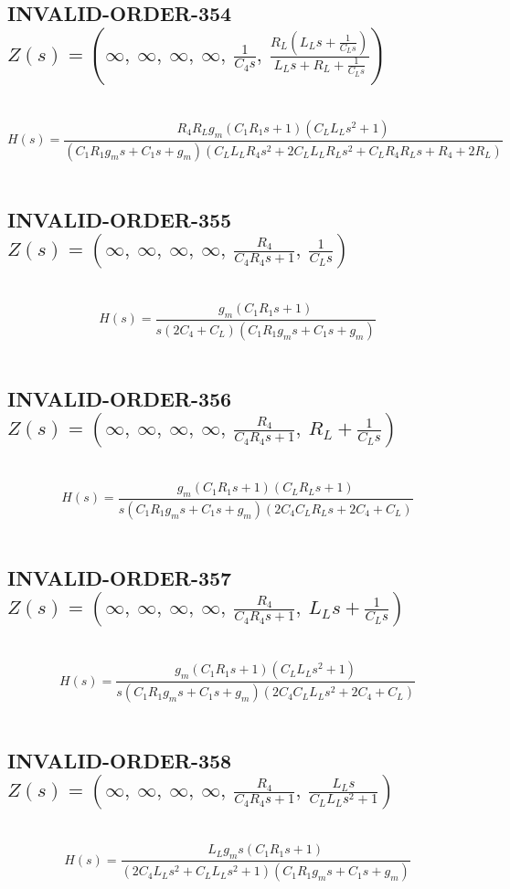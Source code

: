 \documentclass{article}
\begin{document}
\subsection{INVALID-ORDER-354 $Z(s) = \left( \infty, \  \infty, \  \infty, \  \infty, \  \frac{1}{C_{4} s}, \  \frac{R_{L} \left(L_{L} s + \frac{1}{C_{L} s}\right)}{L_{L} s + R_{L} + \frac{1}{C_{L} s}}\right)$ } \ 
\textbf{\[H(s) = \frac{R_{4} R_{L} g_{m} \left(C_{1} R_{1} s + 1\right) \left(C_{L} L_{L} s^{2} + 1\right)}{\left(C_{1} R_{1} g_{m} s + C_{1} s + g_{m}\right) \left(C_{L} L_{L} R_{4} s^{2} + 2 C_{L} L_{L} R_{L} s^{2} + C_{L} R_{4} R_{L} s + R_{4} + 2 R_{L}\right)}\] } \ 
\subsection{INVALID-ORDER-355 $Z(s) = \left( \infty, \  \infty, \  \infty, \  \infty, \  \frac{R_{4}}{C_{4} R_{4} s + 1}, \  \frac{1}{C_{L} s}\right)$ } \ 
\textbf{\[H(s) = \frac{g_{m} \left(C_{1} R_{1} s + 1\right)}{s \left(2 C_{4} + C_{L}\right) \left(C_{1} R_{1} g_{m} s + C_{1} s + g_{m}\right)}\] } \ 
\subsection{INVALID-ORDER-356 $Z(s) = \left( \infty, \  \infty, \  \infty, \  \infty, \  \frac{R_{4}}{C_{4} R_{4} s + 1}, \  R_{L} + \frac{1}{C_{L} s}\right)$ } \ 
\textbf{\[H(s) = \frac{g_{m} \left(C_{1} R_{1} s + 1\right) \left(C_{L} R_{L} s + 1\right)}{s \left(C_{1} R_{1} g_{m} s + C_{1} s + g_{m}\right) \left(2 C_{4} C_{L} R_{L} s + 2 C_{4} + C_{L}\right)}\] } \ 
\subsection{INVALID-ORDER-357 $Z(s) = \left( \infty, \  \infty, \  \infty, \  \infty, \  \frac{R_{4}}{C_{4} R_{4} s + 1}, \  L_{L} s + \frac{1}{C_{L} s}\right)$ } \ 
\textbf{\[H(s) = \frac{g_{m} \left(C_{1} R_{1} s + 1\right) \left(C_{L} L_{L} s^{2} + 1\right)}{s \left(C_{1} R_{1} g_{m} s + C_{1} s + g_{m}\right) \left(2 C_{4} C_{L} L_{L} s^{2} + 2 C_{4} + C_{L}\right)}\] } \ 
\subsection{INVALID-ORDER-358 $Z(s) = \left( \infty, \  \infty, \  \infty, \  \infty, \  \frac{R_{4}}{C_{4} R_{4} s + 1}, \  \frac{L_{L} s}{C_{L} L_{L} s^{2} + 1}\right)$ } \ 
\textbf{\[H(s) = \frac{L_{L} g_{m} s \left(C_{1} R_{1} s + 1\right)}{\left(2 C_{4} L_{L} s^{2} + C_{L} L_{L} s^{2} + 1\right) \left(C_{1} R_{1} g_{m} s + C_{1} s + g_{m}\right)}\] } \ 
\end{document}
